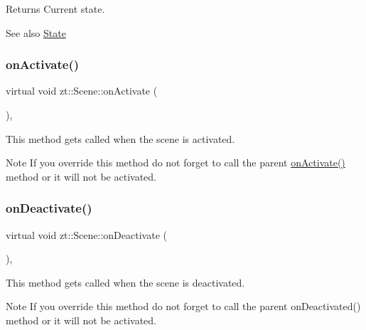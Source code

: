 \begin{DoxyReturn}{Returns}
Current state. 
\end{DoxyReturn}
\begin{DoxySeeAlso}{See also}
\hyperlink{classzt_1_1_scene_a5618d9448cd874af20a6be8ed60c87a5}{State} 
\end{DoxySeeAlso}
\mbox{\label{classzt_1_1_scene_a45f434d305b61e9819fb21efe35189dc}} 
\subsubsection{\texorpdfstring{on\+Activate()}{onActivate()}}
{\footnotesize\ttfamily virtual void zt\+::\+Scene\+::on\+Activate (\begin{DoxyParamCaption}{ }\end{DoxyParamCaption})\hspace{0.3cm}{\ttfamily [protected]}, {\ttfamily [virtual]}}



This method gets called when the scene is activated. 

\begin{DoxyNote}{Note}
If you override this method do not forget to call the parent \hyperlink{classzt_1_1_scene_a45f434d305b61e9819fb21efe35189dc}{on\+Activate()} method or it will not be activated. 
\end{DoxyNote}
\mbox{\label{classzt_1_1_scene_a58390d4649c7c0eda1a3fe2f65952a3f}} 
\subsubsection{\texorpdfstring{on\+Deactivate()}{onDeactivate()}}
{\footnotesize\ttfamily virtual void zt\+::\+Scene\+::on\+Deactivate (\begin{DoxyParamCaption}{ }\end{DoxyParamCaption})\hspace{0.3cm}{\ttfamily [protected]}, {\ttfamily [virtual]}}



This method gets called when the scene is deactivated. 

\begin{DoxyNote}{Note}
If you override this method do not forget to call the parent on\+Deactivated() method or it will not be activated. 
\end{DoxyNote}
\mbox{\label{classzt_1_1_scene_a38821456606a61abb6255fed9954336e}} 
